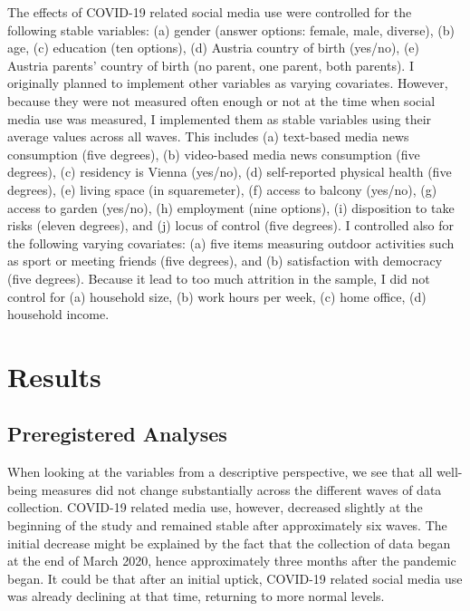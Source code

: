 \documentclass[
  english,
  man,mask,floatsintext]{apa6}
\begin{document}
The effects of COVID-19 related social media use were controlled for the following stable variables:
(a) gender (answer options: female, male, diverse), (b) age, (c) education (ten options), (d) Austria country of birth (yes/no), (e) Austria parents' country of birth (no parent, one parent, both parents).
I originally planned to implement other variables as varying covariates.
However, because they were not measured often enough or not at the time when social media use was measured, I implemented them as stable variables using their average values across all waves.
This includes (a) text-based media news consumption (five degrees), (b) video-based media news consumption (five degrees), (c) residency is Vienna (yes/no), (d) self-reported physical health (five degrees), (e) living space (in squaremeter), (f) access to balcony (yes/no), (g) access to garden (yes/no), (h) employment (nine options), (i) disposition to take risks (eleven degrees), and (j) locus of control (five degrees).
I controlled also for the following varying covariates: (a) five items measuring outdoor activities such as sport or meeting friends (five degrees), and (b) satisfaction with democracy (five degrees).
Because it lead to too much attrition in the sample, I did not control for (a) household size, (b) work hours per week, (c) home office, (d) household income.

\hypertarget{results}{%
\section{Results}\label{results}}

\hypertarget{preregistered-analyses}{%
\subsection{Preregistered Analyses}\label{preregistered-analyses}}

When looking at the variables from a descriptive perspective, we see that all well-being measures did not change substantially across the different waves of data collection.
COVID-19 related media use, however, decreased slightly at the beginning of the study and remained stable after approximately six waves.
The initial decrease might be explained by the fact that the collection of data began at the end of March 2020, hence approximately three months after the pandemic began.
It could be that after an initial uptick, COVID-19 related social media use was already declining at that time, returning to more normal levels.
\end{document}
